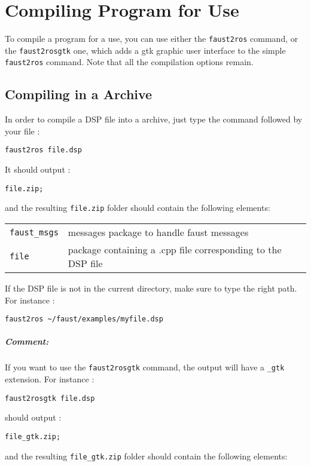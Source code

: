 \chapter{Compiling \faust Program for \ros Use}
\label{chap:compilation}

To compile a \faust program for a \ros use, you can use either the \lstinline'faust2ros' command, or the \lstinline'faust2rosgtk' one, which adds a gtk graphic user interface to the simple \lstinline'faust2ros' command.
Note that all the \faust compilation options remain.

\section{Compiling in a \faust Archive}
In order to compile a DSP file into a \faust archive, just type the command followed by your file : 
\begin{lstlisting}
faust2ros file.dsp
\end{lstlisting}
It should output :
\begin{lstlisting}
file.zip;
\end{lstlisting}
and the resulting  \lstinline'file.zip' folder should contain the following elements:

\begin{tabular}{ll}
	\lstinline'faust_msgs' 		&messages package to handle faust messages\\
	\lstinline'file'		&package containing a .cpp file corresponding to the DSP file\\
\end{tabular}

If the DSP file is not in the current directory, make sure to type the right path. For instance :
\begin{lstlisting}
faust2ros ~/faust/examples/myfile.dsp
\end{lstlisting}


\paragraph{Comment:}If you want to use the \lstinline'faust2rosgtk' command, the output will have a \lstinline'_gtk' extension. For instance :
\begin{lstlisting}
faust2rosgtk file.dsp
\end{lstlisting}
should output :
\begin{lstlisting}
file_gtk.zip;
\end{lstlisting}
and the resulting  \lstinline'file_gtk.zip' folder should contain the following elements:

